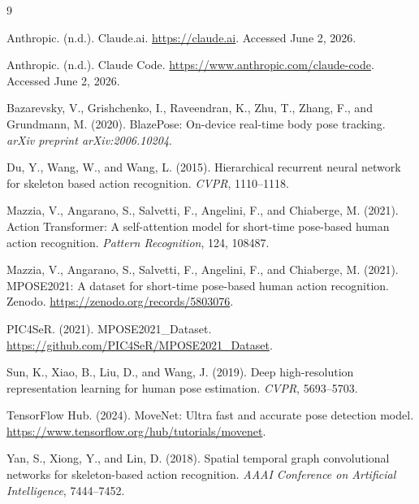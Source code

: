 \documentclass[final]{article}
\begin{document}
\newpage
\begin{thebibliography}{9}

Anthropic. (n.d.).
\newblock Claude.ai.
\newblock \url{https://claude.ai}. Accessed June 2, 2026.

Anthropic. (n.d.).
\newblock Claude Code.
\newblock \url{https://www.anthropic.com/claude-code}. Accessed June 2, 2026.

Bazarevsky, V., Grishchenko, I., Raveendran, K., Zhu, T., Zhang, F., and Grundmann, M. (2020).
\newblock BlazePose: On-device real-time body pose tracking.
\newblock \textit{arXiv preprint arXiv:2006.10204}.

Du, Y., Wang, W., and Wang, L. (2015).
\newblock Hierarchical recurrent neural network for skeleton based action recognition.
\newblock \textit{CVPR}, 1110--1118.

Mazzia, V., Angarano, S., Salvetti, F., Angelini, F., and Chiaberge, M. (2021).
\newblock Action Transformer: A self-attention model for short-time pose-based human action recognition.
\newblock \textit{Pattern Recognition}, 124, 108487.

Mazzia, V., Angarano, S., Salvetti, F., Angelini, F., and Chiaberge, M. (2021).
\newblock MPOSE2021: A dataset for short-time pose-based human action recognition.
\newblock Zenodo. \url{https://zenodo.org/records/5803076}.

PIC4SeR. (2021).
\newblock MPOSE2021\_Dataset.
\newblock \url{https://github.com/PIC4SeR/MPOSE2021_Dataset}.

Sun, K., Xiao, B., Liu, D., and Wang, J. (2019).
\newblock Deep high-resolution representation learning for human pose estimation.
\newblock \textit{CVPR}, 5693--5703.

TensorFlow Hub. (2024).
\newblock MoveNet: Ultra fast and accurate pose detection model.
\newblock \url{https://www.tensorflow.org/hub/tutorials/movenet}.

Yan, S., Xiong, Y., and Lin, D. (2018).
\newblock Spatial temporal graph convolutional networks for skeleton-based action recognition.
\newblock \textit{AAAI Conference on Artificial Intelligence}, 7444--7452.

\end{thebibliography}
\end{document}
